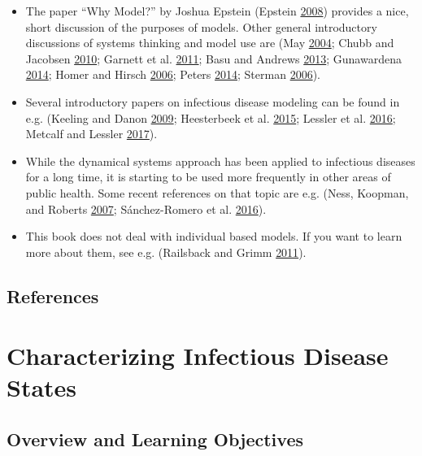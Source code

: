 \documentclass[]{book}
\providecommand{\tightlist}{%
  \setlength{\itemsep}{0pt}\setlength{\parskip}{0pt}}
\theoremstyle{definition}
\theoremstyle{definition}
\theoremstyle{definition}
\theoremstyle{remark}
\begin{document}
\begin{itemize}
\tightlist
\item
  The paper ``Why Model?'' by Joshua Epstein (Epstein
  \protect\hyperlink{ref-epstein08}{2008}) provides a nice, short
  discussion of the purposes of models. Other general introductory
  discussions of systems thinking and model use are (May
  \protect\hyperlink{ref-may04}{2004}; Chubb and Jacobsen
  \protect\hyperlink{ref-chubb10}{2010}; Garnett et al.
  \protect\hyperlink{ref-garnett11}{2011}; Basu and Andrews
  \protect\hyperlink{ref-basu13}{2013}; Gunawardena
  \protect\hyperlink{ref-gunawardena14}{2014}; Homer and Hirsch
  \protect\hyperlink{ref-homer06}{2006}; Peters
  \protect\hyperlink{ref-peters14}{2014}; Sterman
  \protect\hyperlink{ref-sterman06}{2006}).
\item
  Several introductory papers on infectious disease modeling can be
  found in e.g. (Keeling and Danon
  \protect\hyperlink{ref-keeling09}{2009}; Heesterbeek et al.
  \protect\hyperlink{ref-heesterbeek15}{2015}; Lessler et al.
  \protect\hyperlink{ref-lessler16}{2016}; Metcalf and Lessler
  \protect\hyperlink{ref-metcalf17}{2017}).
\item
  While the dynamical systems approach has been applied to infectious
  diseases for a long time, it is starting to be used more frequently in
  other areas of public health. Some recent references on that topic are
  e.g. (Ness, Koopman, and Roberts \protect\hyperlink{ref-ness07}{2007};
  Sánchez-Romero et al. \protect\hyperlink{ref-sanchez-romero16}{2016}).
\item
  This book does not deal with individual based models. If you want to
  learn more about them, see e.g. (Railsback and Grimm
  \protect\hyperlink{ref-railsback11}{2011}).
\end{itemize}

\section{References}\label{references-1}

\chapter{Characterizing Infectious Disease States}\label{idstates}

\section{Overview and Learning
Objectives}\label{overview-and-learning-objectives-1}
\end{document}
